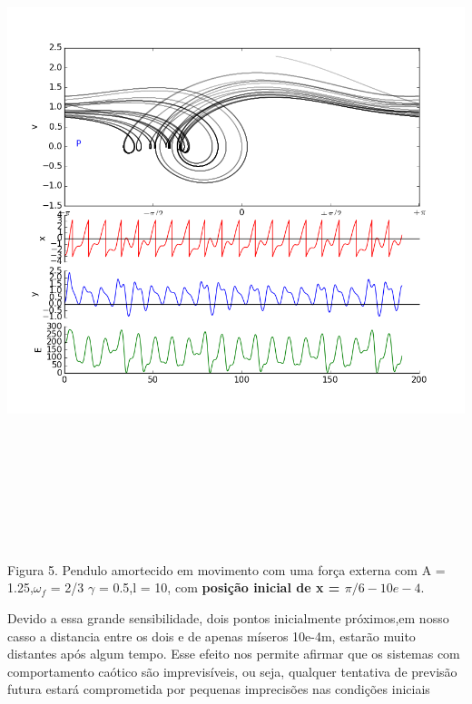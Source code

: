 \documentclass[dvipsnames,a4paper,11pt]{article}
\begin{document}
\begin{center}
	\includegraphics[width=6.24in,height=7.68in,keepaspectratio = false]{image6.png}
	
	\scriptsize Figura 5. Pendulo amortecido em movimento com uma força externa com A = 1.25,$\omega_f$ = 2/3 $\gamma$ = 0.5,l = 10, com \textbf{posição inicial de x = $\pi/6 - 10e-4$}. 
	
\end{center}

Devido a essa grande sensibilidade, dois pontos inicialmente próximos,em nosso casso a distancia entre os dois e de apenas míseros 10e-4m, estarão muito distantes após algum tempo. Esse efeito nos permite afirmar que os sistemas com comportamento caótico são imprevisíveis, ou seja, qualquer tentativa de previsão futura estará comprometida por pequenas imprecisões nas condições iniciais
\end{document}
